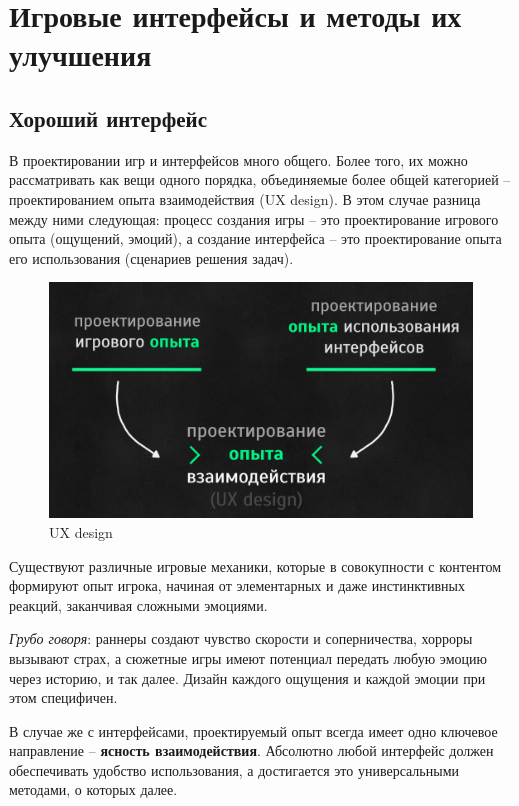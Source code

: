 \documentclass{article}
\begin{document}
\section{Игровые интерфейсы и методы их улучшения}
\subsection{Хороший интерфейс}
В проектировании игр и интерфейсов много общего. Более того, их можно рассматривать как вещи одного порядка, объединяемые более общей категорией -- проектированием опыта взаимодействия (UX design). В этом случае разница между ними следующая: процесс создания игры -- это проектирование игрового опыта (ощущений, эмоций), а создание интерфейса -- это проектирование опыта его использования (сценариев решения задач).

\begin{figure}[H]
  \includegraphics[width=\textwidth]{res/img/uxDesign.png}
  \caption{UX design}
\end{figure}

Существуют различные игровые механики, которые в совокупности с контентом формируют опыт игрока, начиная от элементарных и даже инстинктивных реакций, заканчивая сложными эмоциями.

\textit{Грубо говоря}: раннеры создают чувство скорости и соперничества, хорроры вызывают страх, а сюжетные игры имеют потенциал передать любую эмоцию через историю, и так далее. Дизайн каждого ощущения и каждой эмоции при этом специфичен.

В случае же с интерфейсами, проектируемый опыт всегда имеет одно ключевое направление -- \textbf{ясность взаимодействия}. Абсолютно любой интерфейс должен обеспечивать удобство использования, а достигается это универсальными методами, о которых далее.
\end{document}
